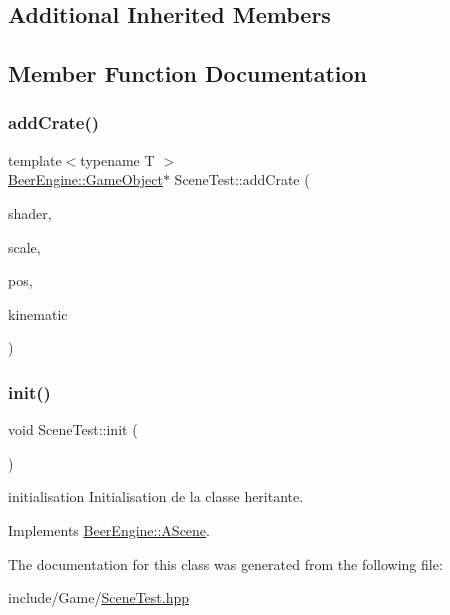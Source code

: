 \subsection*{Additional Inherited Members}


\subsection{Member Function Documentation}
\mbox{\label{class_scene_test_a29d4ffbd6a5035a4d62e9e59b311f791}} 
\subsubsection{\texorpdfstring{add\+Crate()}{addCrate()}}
{\footnotesize\ttfamily template$<$typename T $>$ \\
\mbox{\hyperlink{class_beer_engine_1_1_game_object}{Beer\+Engine\+::\+Game\+Object}}$\ast$ Scene\+Test\+::add\+Crate (\begin{DoxyParamCaption}\item[{\mbox{\hyperlink{class_beer_engine_1_1_graphics_1_1_shader_program}{Beer\+Engine\+::\+Graphics\+::\+Shader\+Program}} $\ast$}]{shader,  }\item[{glm\+::vec3}]{scale,  }\item[{glm\+::vec3}]{pos,  }\item[{\mbox{\hyperlink{namespace_beer_engine_1_1_component_a2cfe279cc309b6420e792597940b8a33}{Beer\+Engine\+::\+Component\+::\+R\+B\+Type}}}]{kinematic }\end{DoxyParamCaption})}

\mbox{\label{class_scene_test_aedded03410798c3705fb3fb028e56ab5}} 
\subsubsection{\texorpdfstring{init()}{init()}}
{\footnotesize\ttfamily void Scene\+Test\+::init (\begin{DoxyParamCaption}\item[{void}]{ }\end{DoxyParamCaption})\hspace{0.3cm}{\ttfamily [virtual]}}



initialisation Initialisation de la classe heritante. 



Implements \mbox{\hyperlink{class_beer_engine_1_1_a_scene_a7a55b4e506ae618e6596ae812ad48db0}{Beer\+Engine\+::\+A\+Scene}}.



The documentation for this class was generated from the following file\+:\begin{DoxyCompactItemize}
\item 
include/\+Game/\mbox{\hyperlink{_scene_test_8hpp}{Scene\+Test.\+hpp}}\end{DoxyCompactItemize}
